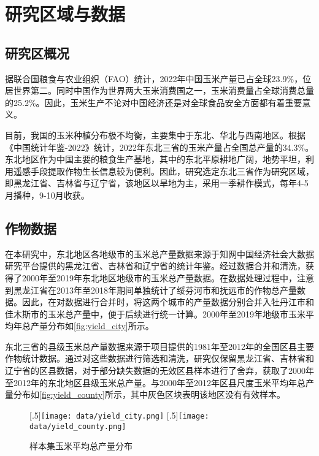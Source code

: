 \cleardoublepage

\section{研究区域与数据}
\subsection{研究区概况}
\par 据联合国粮食与农业组织（FAO）\cite{FAO2022}统计，2022年中国玉米产量已占全球23.9\%，位居世界第二。同时中国作为世界两大玉米消费国之一，玉米消费量占全球消费总量的25.2\%。因此，玉米生产不论对中国经济还是对全球食品安全方面都有着重要意义。
\par 目前，我国的玉米种植分布极不均衡，主要集中于东北、华北与西南地区。根据《中国统计年鉴-2022》\cite{国家统计局2022中国统计年鉴}统计，2022年东北三省的玉米产量占全国总产量的34.3\%。东北地区作为中国主要的粮食生产基地，其中的东北平原耕地广阔，地势平坦，利用遥感手段提取作物生长信息较为便利。因此，研究选定东北三省作为研究区域，即黑龙江省、吉林省与辽宁省，该地区以旱地为主，采用一季耕作模式，每年4-5月播种，9-10月收获。

\subsection{作物数据}
\par 在本研究中，东北地区各地级市的玉米总产量数据来源于知网中国经济社会大数据研究平台\cite{中国经济社会大数据研究平台}提供的黑龙江省、吉林省和辽宁省的统计年鉴。经过数据合并和清洗，获得了2000年至2019年东北地区地级市的玉米总产量数据。在数据处理过程中，注意到黑龙江省在2013年至2018年期间单独统计了绥芬河市和抚远市的作物总产量数据。因此，在对数据进行合并时，将这两个城市的产量数据分别合并入牡丹江市和佳木斯市的玉米总产量中，便于后续进行统一计算。2000年至2019年地级市玉米平均年总产量分布如\autoref{fig:yield_city}所示。

\par 东北三省的县级玉米总产量数据来源于项目提供的1981年至2012年的全国区县主要作物统计数据。通过对这些数据进行筛选和清洗，研究仅保留黑龙江省、吉林省和辽宁省的区县数据，对于部分缺失数据的无效区县样本进行了舍弃，获取了2000年至2012年的东北地区县级玉米总产量。与2000年至2012年区县尺度玉米平均年总产量分布如\autoref{fig:yield_county}所示，其中灰色区块表明该地区没有有效样本。

\begin{figure}
  \centering
  \subcaptionbox{\label{fig:yield_city}}[.5\linewidth]{\texttt{[image: data/yield\_city.png]}}\hfill
  \subcaptionbox{\label{fig:yield_county}}[.5\linewidth]{\texttt{[image: data/yield\_county.png]}}\hfill
  \caption{样本集玉米平均总产量分布}
\end{figure}

